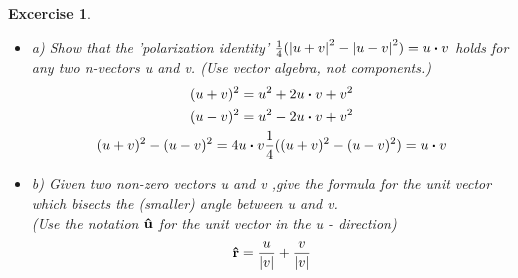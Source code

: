 \documentclass[11pt]{article}
\newtheorem{excercise}{Excercise}
\begin{document}
    \begin{excercise}

        \begin{itemize}
            \item a) Show that the 'polarization identity' $\frac{1}{4}(\abs{u+v}^2 - \abs{u-v}^2)=u\vdot v$ holds for any two n-vectors u and v. (Use vector algebra, not components.)\\
            \begin{gather}
                (u + v)^2 = u^2 + 2u\vdot v + v^2 \\
                (u - v)^2 = u^2 - 2u\vdot v + v^2 \\
                (u + v)^2 - (u - v)^2 = 4u \vdot v
                \frac{1}{4}((u + v)^2 - (u - v)^2 ) = u \vdot v
            \end{gather}
            \item b) Given two non-zero vectors u and v ,give the formula for the unit vector which bisects the (smaller) angle between u and v.\\
            (Use the notation $\vu{u}$ for the unit vector in the u - direction)\\
            \begin{gather}
                      \vu{r}=\frac{u}{\abs{v}} + \frac{v}{\abs{v}}
            \end{gather}
        \end{itemize}
    \end{excercise}
\end{document}
